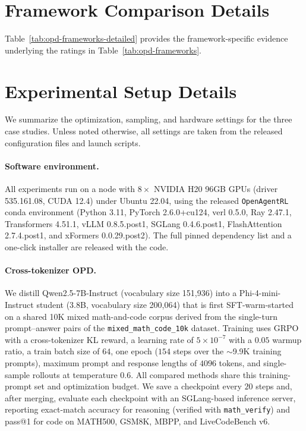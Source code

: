 \section{Framework Comparison Details}
\label{app:framework-comparison}


Table~\ref{tab:opd-frameworks-detailed} provides the
framework-specific evidence underlying the ratings in
Table~\ref{tab:opd-frameworks}.

\section{Experimental Setup Details}
\label{app:exp_setup}

We summarize the optimization, sampling, and hardware settings for the three
case studies. Unless noted otherwise, all settings are taken from the released
configuration files and launch scripts.

\paragraph{Software environment.}
All experiments run on a node with $8\times$ NVIDIA H20 96GB GPUs
(driver 535.161.08, CUDA 12.4) under Ubuntu 22.04, using the released
\texttt{OpenAgentRL} conda environment (Python 3.11, PyTorch 2.6.0+cu124,
verl 0.5.0, Ray 2.47.1, Transformers 4.51.1, vLLM 0.8.5.post1,
SGLang 0.4.6.post1, FlashAttention 2.7.4.post1, and xFormers 0.0.29.post2).
The full pinned dependency list and a one-click installer are released with the
code.

\paragraph{Cross-tokenizer OPD.}
We distill Qwen2.5-7B-Instruct (vocabulary size 151{,}936) into a
Phi-4-mini-Instruct student (3.8B, vocabulary size 200{,}064) that is first
SFT-warm-started on a shared 10K mixed math-and-code corpus derived from the
single-turn prompt--answer pairs of the \texttt{mixed\_math\_code\_10k} dataset.
Training uses GRPO with a cross-tokenizer KL reward, a learning rate of
$5\times10^{-7}$ with a $0.05$ warmup ratio, a train batch size of $64$, one
epoch ($154$ steps over the $\sim$9.9K training prompts), maximum prompt and
response lengths of $4096$ tokens, and single-sample rollouts at temperature
$0.6$. All compared methods share this training-prompt set and optimization
budget. We save a checkpoint every $20$ steps and, after merging, evaluate each
checkpoint with an SGLang-based inference server, reporting exact-match accuracy
for reasoning (verified with \texttt{math\_verify}) and pass@1 for code on
MATH500, GSM8K, MBPP, and LiveCodeBench v6.

